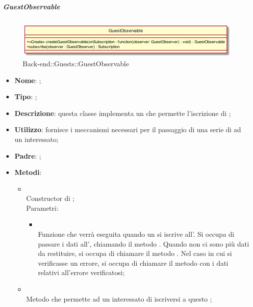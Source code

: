 \hypertarget{GuestObservable_label}{\subparagraph{GuestObservable}}
\begin{figure}[h]
	\centering
	\includegraphics[width=\textwidth,height=\textheight,keepaspectratio]{images/ClassGuestObservable.png}
	\caption{Back-end::Guests::GuestObservable}
\end{figure}
\begin{itemize}
	\item \textbf{Nome}: ;
	\item \textbf{Tipo}: ;
	\item \textbf{Descrizione}: questa classe implementa un  che permette l'iscrizione di ;
	\item \textbf{Utilizzo}: fornisce i meccanismi necessari per il passaggio di una serie di  ad un  interessato;
	\item \textbf{Padre}: ;
	\item \textbf{Metodi}:
	\begin{itemize}
		\item[]  \\		Constructor di ;\\
		Parametri:
		\begin{itemize}
			\item {} \\
			Funzione che verrà eseguita quando un  si iscrive all'. Si occupa di passare i dati all', chiamando il metodo . Quando non ci sono più dati da restituire, si occupa di chiamare il metodo . Nel caso in cui si verificasse un errore, si occupa di chiamare il metodo  con i dati relativi all'errore verificatosi;
		\end{itemize}
		\item[]  \\		Metodo che permette ad un  interessato di iscriversi a questo ;\\

\end{itemize}
\end{itemize}
